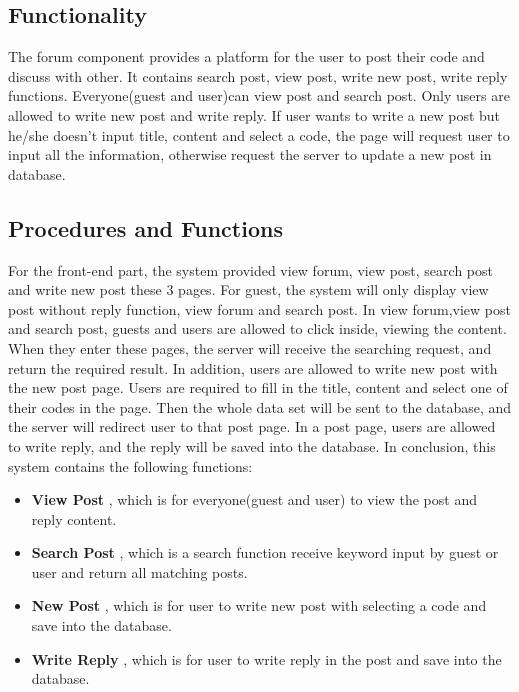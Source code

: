\subsection{Functionality}
The forum component provides a platform for the user to post their code and discuss with other. It contains search post, view post, write new post, write reply functions. Everyone(guest and user)can view post and search post. Only users are allowed to write new post and write reply. If user wants to write a new post but he/she doesn't input title, content and select a code, the page will request user to input all the information, otherwise request the server to update a new post in database.\newline

\subsection{Procedures and Functions}
For the front-end part, the system provided view forum, view post, search post and write new post these 3 pages. For guest, the system will only display view post without reply function, view forum and search post.\newline\newline
In view forum,view post and search post, guests and users are allowed to click inside, viewing the content. When they enter these pages, the server will receive the searching request, and return the required result.\newline\newline
In addition, users are allowed to write new post with the new post page. Users are required to fill in the title, content and select one of their codes in the page. Then the whole data set will be sent to the database, and the server will redirect user to that post page. In a post page, users are allowed to write reply, and the reply will be saved into the database.\newline\newline
In conclusion, this system contains the following functions:

\begin{itemize}

\item
\textbf{View Post}
, which is for everyone(guest and user) to view the post and reply content.\newline

\item
\textbf{Search Post}
, which is a search function receive keyword input by guest or user and return all matching posts.\newline

\item
\textbf{New Post}
, which is for user to write new post with selecting a code and save into the database.\newline

\item
\textbf{Write Reply}
, which is for user to write reply in the post and save into the database.\newline

\end{itemize}
\clearpage

